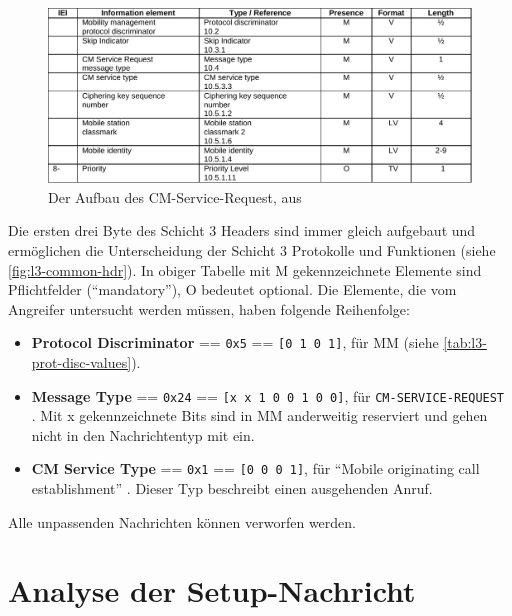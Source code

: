 \begin{figure}[H]
	\centering \includegraphics[width=1.0\linewidth]{figures/24008_tab_9-2-11.pdf}
	\caption[Der Aufbau des CM-Service-Request]{Der Aufbau des \ac{CM}-Service-Request, aus \citep[Tabelle 9.2.11]{3gpp:24.008}} \label{fig:cm-service-request}
\end{figure}

Die ersten drei Byte des Schicht 3 Headers sind immer gleich aufgebaut und ermöglichen die Unterscheidung der Schicht 3 Protokolle und Funktionen (siehe \autoref{fig:l3-common-hdr}). In obiger Tabelle mit M gekennzeichnete Elemente sind Pflichtfelder ("`mandatory"'), O  bedeutet optional. Die Elemente, die vom Angreifer untersucht werden müssen, haben folgende Reihenfolge:
\begin{itemize}
\item \textbf{Protocol Discriminator} == \texttt{0x5} == \texttt{[0 1 0 1]}, für \ac{MM} (siehe \autoref{tab:l3-prot-disc-values}).
\item \textbf{Message Type} == \texttt{0x24} == \texttt{[x x 1 0 0 1 0 0]}, für \texttt{CM-SERVICE-REQUEST} \citep[Tabelle 10.2]{3gpp:24.008}. Mit x gekennzeichnete Bits sind in \ac{MM} anderweitig reserviert und gehen nicht in den Nachrichtentyp mit ein.
\item \textbf{\ac{CM} Service Type} == \texttt{0x1} == \texttt{[0 0 0 1]}, für "`Mobile originating call establishment"' \citep[Tabelle 10.5.91]{3gpp:24.008}. Dieser Typ beschreibt einen ausgehenden Anruf.
\end{itemize}
Alle unpassenden Nachrichten können verworfen werden.

\section{Analyse der Setup-Nachricht}

